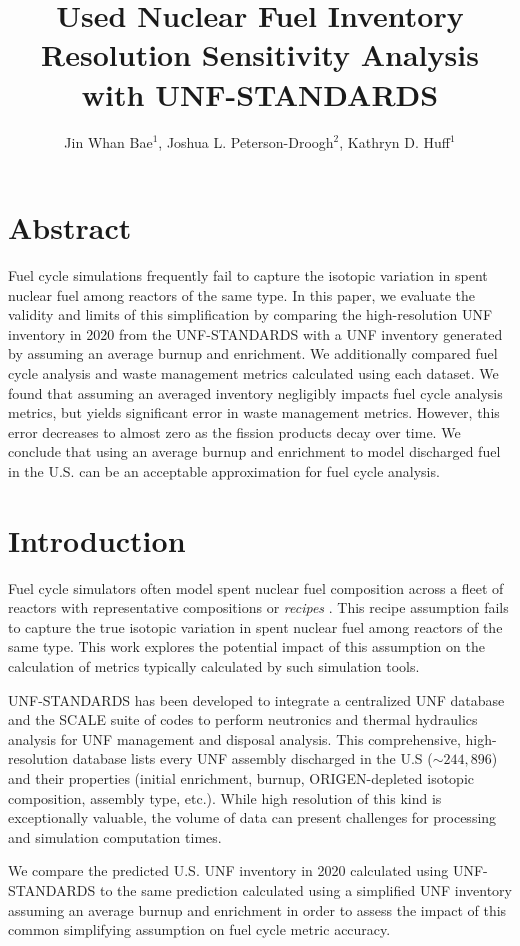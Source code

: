 \documentclass{anstrans}
\title{Used Nuclear Fuel Inventory Resolution Sensitivity Analysis with UNF-STANDARDS}
\author{Jin Whan Bae$^{1}$, Joshua L. Peterson-Droogh$^{2}$, Kathryn D. Huff$^{1}$}
\institute{
$^{1}$ Dept. of Nuclear, Plasma, and Radiological Engineering, University of Illinois at Urbana-Champaign, Urbana, IL
\and
$^{2}$ Oak Ridge National Laboratory, Oak Ridge, TN}
\date{}
\begin{document}
\section{Abstract}
Fuel cycle simulations frequently fail to capture the isotopic variation in spent nuclear 
fuel among reactors of the same type. In this paper, we evaluate the validity and limits of 
this simplification by comparing the high-resolution \gls{UNF} inventory in 2020 from the \gls{UNF-STANDARDS} \cite{peterson_used_2013} with a \gls{UNF} inventory generated by 
assuming an average burnup and enrichment.
We additionally compared fuel cycle analysis and waste management metrics calculated using 
each dataset. We found that assuming an averaged inventory negligibly impacts fuel cycle 
analysis metrics, but yields significant error in waste management metrics. However, this 
error decreases to almost zero as the fission products decay over time. We conclude that 
using an average burnup and enrichment to model discharged fuel in the U.S. can be an 
acceptable approximation for fuel cycle analysis.

\section{Introduction}
Fuel cycle simulators often model spent nuclear fuel composition across a fleet of 
reactors with representative compositions or \emph{recipes} \cite{huff_fundamental_2016, jacobson_vision_2010, gregg_analysis_2012, feng_standardized_2016}. This recipe assumption fails 
to capture the true isotopic variation in spent nuclear fuel among reactors of the same type. 
This work explores the potential impact of this assumption on the calculation of metrics 
typically calculated by such simulation tools.

\gls{UNF-STANDARDS} has been developed to integrate
a centralized \gls{UNF} database \cite{peterson_used_2013} and the SCALE suite of codes \cite{noauthor_scale_nodate} to
perform neutronics and thermal hydraulics analysis for 
\gls{UNF} management and disposal analysis.
This comprehensive, high-resolution database lists every \gls{UNF} assembly discharged 
in the U.S ($\sim244,896$) and their properties
(initial enrichment, burnup, ORIGEN-depleted isotopic composition, assembly type, etc.).
While high resolution of this kind is exceptionally valuable, the volume of data can 
present challenges for processing and simulation computation times.

We compare the predicted U.S. \gls{UNF} inventory in 2020 calculated using
\gls{UNF-STANDARDS} to the same prediction calculated using a simplified \gls{UNF} 
inventory assuming an average burnup and enrichment in order to assess the impact of this common simplifying assumption on fuel cycle metric accuracy.
\end{document}
